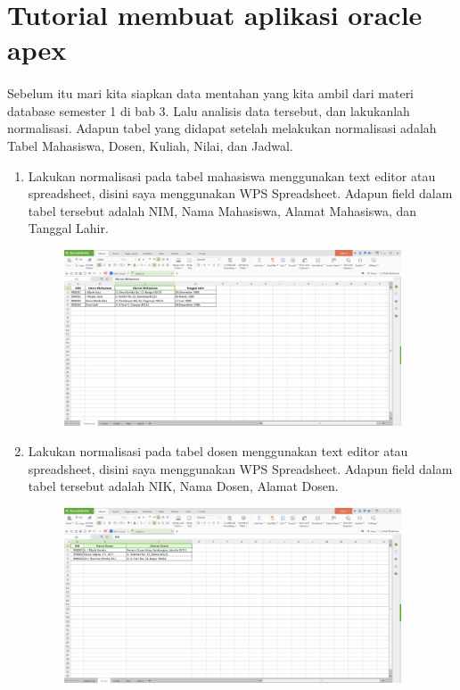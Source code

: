 \clearpage
\setcounter{page}{1}

\section{Tutorial membuat aplikasi oracle apex}
\paragraph{}
    Sebelum itu mari kita siapkan data mentahan yang kita ambil dari materi database semester 1 di bab 3. Lalu analisis data tersebut, dan lakukanlah normalisasi. Adapun tabel yang didapat setelah melakukan normalisasi adalah Tabel Mahasiswa, Dosen, Kuliah, Nilai, dan Jadwal. 
\begin{enumerate}
    \item Lakukan normalisasi pada tabel mahasiswa menggunakan text editor atau spreadsheet, disini saya menggunakan WPS Spreadsheet. Adapun field dalam tabel tersebut adalah NIM, Nama Mahasiswa, Alamat Mahasiswa, dan Tanggal Lahir.
    \begin{figure}[ht]
    \centerline{\includegraphics[width=10cm]{Figures/Mahasiswa.PNG}}
    \end{figure}
    \item Lakukan normalisasi pada tabel dosen menggunakan text editor atau spreadsheet, disini saya menggunakan WPS Spreadsheet. Adapun field dalam tabel tersebut adalah NIK, Nama Dosen, Alamat Dosen.
    \begin{figure}[ht]
    \centerline{\includegraphics[width=10cm]{Figures/Dosen.PNG}}

\end{figure}
\end{enumerate}
